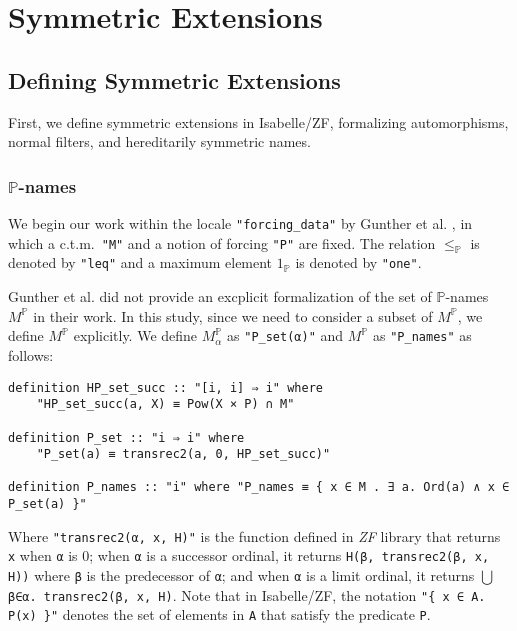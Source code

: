 \documentclass{report}
\newenvironment{isaframe}{\begin{mdframed}[topline=false, rightline=false, bottomline=false]}{\end{mdframed}}
\begin{document}
\section{Symmetric Extensions}


\subsection{Defining Symmetric Extensions}
First, we define symmetric extensions in Isabelle/ZF,
formalizing automorphisms, normal filters, and hereditarily symmetric names.


\subsubsection{$\mathbb{P}$-names}
We begin our work within the locale \texttt{"forcing\_data"} by Gunther et al. \cite{gunther_forcing}, 
in which a c.t.m.\  \texttt{"M"} and a notion of forcing \texttt{"P"} are fixed.
The relation $\leq_{\mathbb{P}}$ is denoted by \texttt{"leq"} and 
a maximum element $1_{\mathbb{P}}$ is denoted by \texttt{"one"}.

Gunther et al. did not provide an excplicit formalization of the set of $\mathbb{P}$-names $M^{\mathbb{P}}$ in their work.
In this study, since we need to consider a subset of $M^{\mathbb{P}}$, we define $M^{\mathbb{P}}$ explicitly.
We define $M^{\mathbb{P}}_{\alpha}$ as \texttt{"P\_set(α)"} and $M^{\mathbb{P}}$ as \texttt{"P\_names"} as follows:

\begin{isaframe}
\begin{verbatim}
definition HP_set_succ :: "[i, i] ⇒ i" where 
    "HP_set_succ(a, X) ≡ Pow(X × P) ∩ M" 

definition P_set :: "i ⇒ i" where 
    "P_set(a) ≡ transrec2(a, 0, HP_set_succ)" 

definition P_names :: "i" where "P_names ≡ { x ∈ M . ∃ a. Ord(a) ∧ x ∈ P_set(a) }" 
\end{verbatim}
\end{isaframe} 

Where \texttt{"transrec2(α, x, H)"} is the function defined in \emph{ZF} library
that returns \texttt{x} when \texttt{α} is 0;
when \texttt{α} is a successor ordinal, it returns \texttt{H(β, transrec2(β, x, H))} where \texttt{β} is the predecessor of \texttt{α};
and when \texttt{α} is a limit ordinal, it returns $\bigcup$\texttt{β∈α. transrec2(β, x, H)}.
Note that in Isabelle/ZF, the notation \texttt{"\{ x ∈ A. P(x) \}"} denotes
the set of elements in \texttt{A} that satisfy the predicate \texttt{P}.
\end{document}

